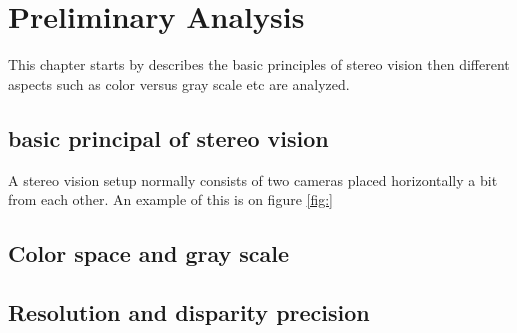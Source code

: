 \chapter{Preliminary Analysis}
This chapter starts by describes the basic principles of stereo vision then different aspects such as color versus gray scale etc are analyzed. 

\section{basic principal of stereo vision}
A stereo vision setup normally consists of two cameras placed horizontally a bit from each other. An example of this is on figure \ref{fig:}






\section{Color space and gray scale}

\section{Resolution and disparity precision}

